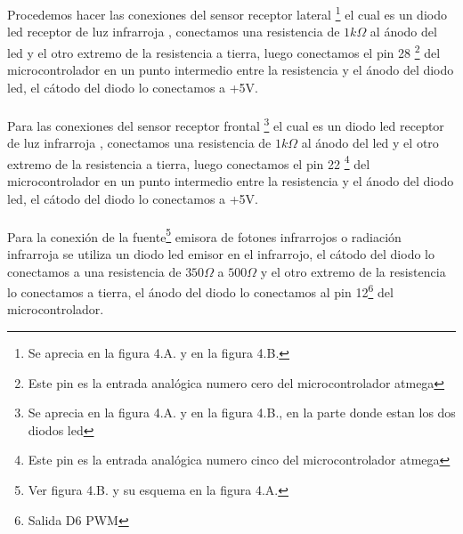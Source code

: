 \documentclass[12]{article}
\begin{document}
\begin{multicols}{2}
Procedemos hacer las conexiones del sensor receptor lateral \footnote{Se aprecia en la figura 4.A. y en la figura 4.B.} el cual es un diodo led receptor de luz infrarroja \cite{INFRARED}, conectamos una resistencia de $1 k\Omega$ al ánodo del led y el otro extremo de la resistencia a tierra, luego conectamos el pin 28 \footnote{Este pin es la entrada analógica numero cero del microcontrolador atmega} del microcontrolador en un punto intermedio entre la resistencia y el ánodo del diodo led, el cátodo del diodo lo conectamos a +5V.\\\\
Para las conexiones del sensor receptor frontal \footnote{Se aprecia en la figura 4.A. y en la figura 4.B., en la parte donde estan los dos diodos led} el cual es un diodo led receptor de luz infrarroja \cite{INFRARED}, conectamos una resistencia de $1 k\Omega$ al ánodo del led y el otro extremo de la resistencia a tierra, luego conectamos el pin 22 \footnote{Este pin es la entrada analógica numero cinco del microcontrolador atmega} del microcontrolador en un punto intermedio entre la resistencia y el ánodo del diodo led, el cátodo del diodo lo conectamos a +5V.\\\\
Para la conexión de la fuente\footnote{Ver figura 4.B. y su esquema en la figura 4.A.} emisora de fotones infrarrojos o radiación infrarroja se utiliza un diodo led emisor en el infrarrojo, el cátodo del diodo lo conectamos a una resistencia de $350 \Omega$ a $500 \Omega$ y el otro extremo de la resistencia lo conectamos a tierra, el ánodo del diodo lo conectamos al pin 12\footnote{Salida D6 PWM} del microcontrolador.


\end{multicols}
\end{document}
